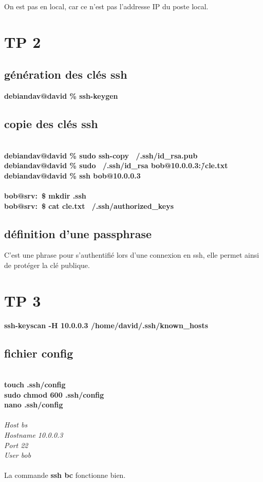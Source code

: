 \documentclass{report}
\begin{document}
On est pas en local, car ce n'est pas l'addresse IP du poste local.

\section{TP 2}
\subsection{génération des clés ssh}
\textbf{debiandav@david \% ssh-keygen} \\

\subsection{copie des clés ssh}
\\ 
\textbf{debiandav@david \% sudo ssh-copy ~/.ssh/id\_rsa.pub} \\
\textbf{debiandav@david \% sudo ~/.ssh/id\_rsa bob@10.0.0.3:\./cle.txt} \\ 
\textbf{debiandav@david \% ssh bob@10.0.0.3} \\
\\
\textbf{bob@srv:~\$ mkdir .ssh} \\
\textbf{bob@srv:~\$ cat cle.txt \> ~/.ssh/authorized\_keys} \\

\subsection{définition d'une passphrase}
C'est une phrase pour s'authentifié lors d'une connexion en ssh, 
elle permet ainsi de protéger la clé publique.

\section{TP 3}
\textbf{ssh-keyscan -H 10.0.0.3 \> /home/david/.ssh/known\_hosts} \\

\subsection{fichier config}
\\
\textbf{touch .ssh/config} \\ 
\textbf{sudo chmod 600 .ssh/config} \\
\textbf{nano .ssh/config} \\
\\
\textit{Host bs} \\
\textit{Hostname 10.0.0.3} \\
\textit{Port 22} \\
\textit{User bob} \\
\\
La commande \textbf{ssh bc} fonctionne bien.
\end{document}

